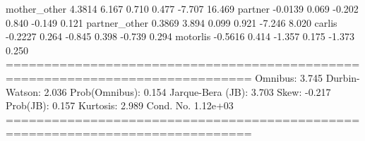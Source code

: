 mother_other           4.3814      6.167      0.710      0.477      -7.707      16.469
partner               -0.0139      0.069     -0.202      0.840      -0.149       0.121
partner_other          0.3869      3.894      0.099      0.921      -7.246       8.020
carlis                -0.2227      0.264     -0.845      0.398      -0.739       0.294
motorlis              -0.5616      0.414     -1.357      0.175      -1.373       0.250
==============================================================================
Omnibus:                        3.745   Durbin-Watson:                   2.036
Prob(Omnibus):                  0.154   Jarque-Bera (JB):                3.703
Skew:                          -0.217   Prob(JB):                        0.157
Kurtosis:                       2.989   Cond. No.                     1.12e+03
==============================================================================

